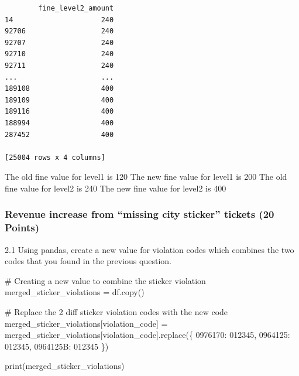 \documentclass[
  letterpaper,
  DIV=11,
  numbers=noendperiod]{scrartcl}
\newenvironment{Shaded}{\begin{snugshade}}{\end{snugshade}}
\newcommand{\BuiltInTok}[1]{\textcolor[rgb]{0.00,0.23,0.31}{#1}}
\newcommand{\CommentTok}[1]{\textcolor[rgb]{0.37,0.37,0.37}{#1}}
\newcommand{\NormalTok}[1]{\textcolor[rgb]{0.00,0.23,0.31}{#1}}
\newcommand{\OperatorTok}[1]{\textcolor[rgb]{0.37,0.37,0.37}{#1}}
\newcommand{\StringTok}[1]{\textcolor[rgb]{0.13,0.47,0.30}{#1}}
\begin{document}
\begin{verbatim}
        fine_level2_amount  
14                     240  
92706                  240  
92707                  240  
92710                  240  
92711                  240  
...                    ...  
189108                 400  
189109                 400  
189116                 400  
188994                 400  
287452                 400  

[25004 rows x 4 columns]
\end{verbatim}

The old fine value for level1 is 120 The new fine value for level1 is
200 The old fine value for level2 is 240 The new fine value for level2
is 400

\subsubsection{Revenue increase from ``missing city sticker'' tickets
(20
Points)}\label{revenue-increase-from-missing-city-sticker-tickets-20-points}

2.1 Using pandas, create a new value for violation codes which combines
the two codes that you found in the previous question.

\begin{Shaded}
\begin{Highlighting}[]
\CommentTok{\# Creating a new value to combine the sticker violation}
\NormalTok{merged\_sticker\_violations }\OperatorTok{=}\NormalTok{ df.copy()}

\CommentTok{\# Replace the 2 diff sticker violation codes with the new code}
\NormalTok{merged\_sticker\_violations[}\StringTok{\textquotesingle{}violation\_code\textquotesingle{}}\NormalTok{] }\OperatorTok{=}\NormalTok{ merged\_sticker\_violations[}\StringTok{\textquotesingle{}violation\_code\textquotesingle{}}\NormalTok{].replace(\{}
    \StringTok{\textquotesingle{}0976170\textquotesingle{}}\NormalTok{: }\StringTok{\textquotesingle{}012345\textquotesingle{}}\NormalTok{,}
    \StringTok{\textquotesingle{}0964125\textquotesingle{}}\NormalTok{: }\StringTok{\textquotesingle{}012345\textquotesingle{}}\NormalTok{,}
    \StringTok{\textquotesingle{}0964125B\textquotesingle{}}\NormalTok{: }\StringTok{\textquotesingle{}012345\textquotesingle{}}
\NormalTok{\})}

\BuiltInTok{print}\NormalTok{(merged\_sticker\_violations)}
\end{Highlighting}
\end{Shaded}
\end{document}
